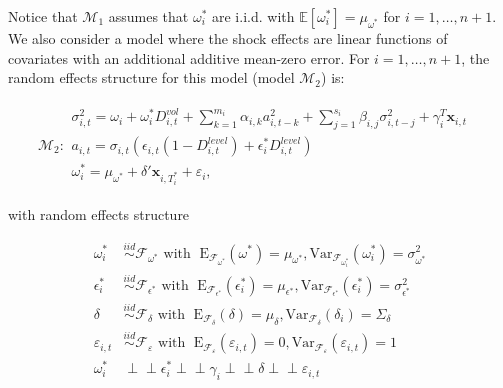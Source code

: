\documentclass[11pt]{article}
\newcommand{\x}{\textbf{x}}
\def\mbf#1{\mathbf{#1}} %
\newcommand{\simiid}{\stackrel{iid}{\sim}} %
\newcommand{\indep}{\perp \!\!\! \perp } %
\def\mrm#1{\mathrm{#1}} %
\def\mc#1{\mathcal{#1}} %
\def\E{\mathbb{E}} %
\def\mc#1{\mathcal{#1}}
\theoremstyle{definition}
\begin{document}
Notice that $\mc{M}_1$ assumes that $\omega^{*}_i$ are i.i.d. with $\E[ \omega^{*}_i]=\mu_{\omega^{*}}$ for $i = 1, \ldots, n+1$. We also consider a model where the shock effects are linear functions of covariates with an additional additive mean-zero error. For $i = 1, \ldots, n+1$, the random effects structure for this model (model $\mc{M}_2$) is:

\begin{align*}
  \mc{M}_2 \colon \begin{array}{l}
     \sigma^{2}_{i,t} = \omega_{i} + \omega^{*}_i D^{vol}_{i,t} + \sum^{m_{i}}_{k=1}\alpha_{i,k}a^{2}_{i,t-k} + \sum_{j=1}^{s_{i}}\beta_{i,j}\sigma_{i,t-j}^{2} + \gamma_{i}^{T} \x_{i,t} \text{ }\\[.2cm]
     a_{i,t} = \sigma_{i,t}(\epsilon_{i,t}(1-D^{level}_{i,t}) + \epsilon^{*}_{i}D^{level}_{i,t})\\[.2cm]
     \omega_i^{*} = \mu_{\omega^{*}}+\delta'\mbf{x}_{i, T_i^*}+ \varepsilon_{i},
  \end{array}
  \end{align*}

  with random effects structure

  \begin{align*}
    \omega^{*}_i &\simiid \mc{F}_{\omega^{*}} \text{ with }  \; \mrm{E}_{\mc{F}_{\omega^{*}}}(\omega^{*}) = \mu_{\omega^{*}}, \mrm{Var}_{\mc{F}_{\omega^{*}_i}}(\omega^{*}_i)  = \sigma^2_{\omega^{*}}  \\
    \epsilon^{*}_i &\simiid \mc{F}_{\epsilon^{*}} \text{ with }  \; \mrm{E}_{\mc{F}_{\epsilon^{*}}}(\epsilon^{*}_i) = \mu_{\epsilon^{*}}, \mrm{Var}_{\mc{F}_{\epsilon^{*}}}(\epsilon^{*}_i)  = \sigma^2_{\epsilon^{*}}  \\
    \delta &\simiid \mc{F}_{\delta} \text{ with }  \; \mrm{E}_{\mc{F}_{\delta}}(\delta) = \mu_{\delta}, \mrm{Var}_{\mc{F}_{\delta}}(\delta_i)  = \Sigma_{\delta} \\
    \varepsilon_{i,t} & \simiid  \mc{F}_{\varepsilon} \text{ with }  \; \mrm{E}_{\mc{F}_{\varepsilon}}(\varepsilon_{i,t}) = 0, \mrm{Var}_{\mc{F}_{\varepsilon}}(\varepsilon_{i,t})  = 1 \\
    \omega^{*}_i &\indep  \epsilon^{*}_i \indep \gamma_i \indep \delta \indep \varepsilon_{i,t}
    \end{align*}
\end{document}
